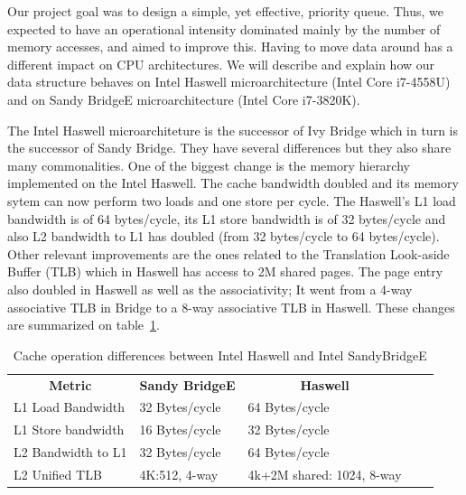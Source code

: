Our project goal was to design a simple, yet effective, priority queue. Thus, we expected to have an operational intensity dominated mainly by the number of memory accesses, and aimed to improve this. Having to move data around has a different impact on CPU architectures. We will describe and explain how our data structure behaves on Intel Haswell microarchitecture (Intel Core i7-4558U) and on Sandy BridgeE microarchitecture (Intel Core i7-3820K). 

The Intel Haswell microarchiteture is the successor of Ivy Bridge which in turn is the successor of Sandy Bridge. They have several differences but they also share many commonalities. One of the biggest change is the memory hierarchy implemented on the Intel Haswell. The cache bandwidth doubled and its memory sytem can now perform two loads and one store per cycle. The Haswell's L1 load bandwidth is of 64 bytes/cycle, its L1 store bandwidth is of 32 bytes/cycle and also L2 bandwidth to L1 has doubled (from 32 bytes/cycle to 64 bytes/cycle). Other relevant improvements are the ones related to the Translation Look-aside Buffer (TLB) which in Haswell has access to 2M shared pages. The page entry also doubled in Haswell as well as the associativity; It went from a 4-way associative TLB in 
 Bridge to a 8-way associative TLB in Haswell. These changes are summarized on table~\ref{tab:haswell_ivy}.

\begin{table}[ht]
\footnotesize
\begin{tabular}{|l|l|l|ll}
\cline{1-3}
\multicolumn{1}{|c|}{\textbf{Metric}} & \multicolumn{1}{c|}{\textbf{Sandy BridgeE}} & \multicolumn{1}{c|}{\textbf{Haswell}} &  &  \\ \cline{1-3}
L1 Load Bandwidth                     & 32 Bytes/cycle                           & 64 Bytes/cycle                        &  &  \\ \cline{1-3}
L1 Store bandwidth                    & 16 Bytes/cycle                           & 32 Bytes/cycle                        &  &  \\ \cline{1-3}
L2 Bandwidth to L1                    & 32 Bytes/cycle                           & 64 Bytes/cycle                        &  &  \\ \cline{1-3}
L2 Unified TLB                        & 4K:512, 4-way                            & 4k+2M shared: 1024, 8-way             &  &  \\ \cline{1-3}
\end{tabular}
\caption{Cache operation differences between Intel Haswell and Intel SandyBridgeE}
\label{tab:haswell_ivy}
\end{table}

